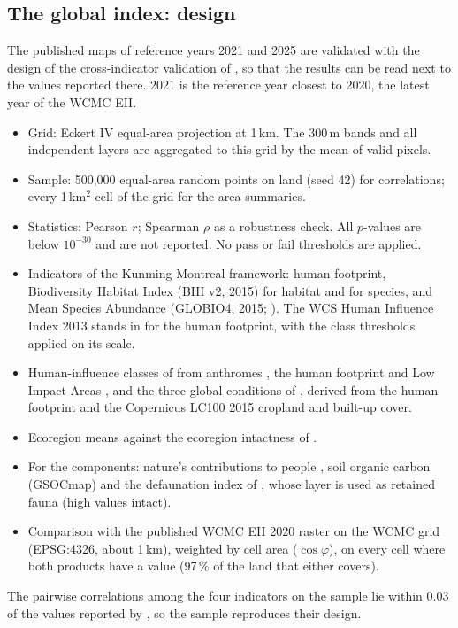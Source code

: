 \documentclass[11pt,a4paper]{article}
\begin{document}
\subsection{The global index: design}
\label{sec:global}

The published maps of reference years 2021 and 2025 are validated with the design of the
cross-indicator validation of \citet[Appendix A2]{hill2026}, so that the results can be read next
to the values reported there. 2021 is the reference year closest to 2020, the latest year of the
WCMC EII.
\begin{itemize}
\item Grid: Eckert IV equal-area projection at 1\,km. The 300\,m bands and all independent layers
are aggregated to this grid by the mean of valid pixels.
\item Sample: 500,000 equal-area random points on land (seed 42) for correlations; every
1\,km$^2$ cell of the grid for the area summaries.
\item Statistics: Pearson $r$; Spearman $\rho$ as a robustness check. All $p$-values are below
$10^{-30}$ and are not reported. No pass or fail thresholds are applied.
\item Indicators of the Kunming-Montreal framework: human footprint, Biodiversity Habitat Index
(BHI v2, 2015) for habitat and for species, and Mean Species Abundance (GLOBIO4, 2015;
\citealp{schipper2020}). The WCS Human Influence Index 2013 stands in for the
\citet{williams2020} human footprint, with the class thresholds applied on its scale.
\item Human-influence classes of \citet[Table A10]{hill2026} from anthromes \citep{ellis2010},
the human footprint and Low Impact Areas \citep{jacobson2019}, and the three
global conditions of \citet{locke2019}, derived from the human footprint and the Copernicus
LC100 2015 cropland and built-up cover.
\item Ecoregion means against the ecoregion intactness of \citet{beyer2020}.
\item For the components: nature's contributions to people \citep{chaplinkramer2019}, soil
organic carbon (GSOCmap) and the defaunation index of \citet{benitezlopez2019}, whose layer
is used as retained fauna (high values intact).
\item Comparison with the published WCMC EII 2020 raster on the WCMC grid (EPSG:4326, about
1\,km), weighted by cell area ($\cos\varphi$), on every cell where both products have a value
(97\,\% of the land that either covers).
\end{itemize}
The pairwise correlations among the four indicators on the sample lie within 0.03 of the values
reported by \citet{hill2026}, so the sample reproduces their design.
\end{document}
